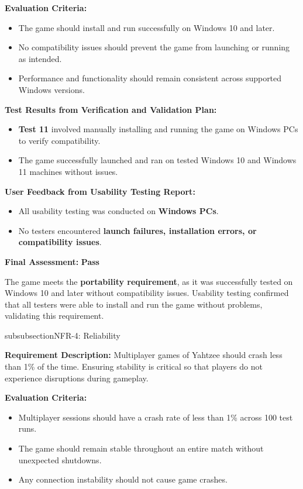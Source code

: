 \documentclass[12pt, titlepage]{article}
\begin{document}
\textbf{Evaluation Criteria:}  
\begin{itemize}
    \item The game should install and run successfully on Windows 10 and later.
    \item No compatibility issues should prevent the game from launching or running as intended.
    \item Performance and functionality should remain consistent across supported Windows versions.
\end{itemize}

\textbf{Test Results from Verification and Validation Plan:}  
\begin{itemize}
    \item \textbf{Test 11} involved manually installing and running the game on Windows PCs to verify compatibility.
    \item The game successfully launched and ran on tested Windows 10 and Windows 11 machines without issues.
\end{itemize}

\textbf{User Feedback from Usability Testing Report:}  
\begin{itemize}
    \item All usability testing was conducted on \textbf{Windows PCs}.
    \item No testers encountered \textbf{launch failures, installation errors, or compatibility issues}.
\end{itemize}

\textbf{Final Assessment:} \textbf{Pass}  

The game meets the \textbf{portability requirement}, as it was successfully tested on Windows 10 and later without compatibility issues. Usability testing confirmed that all testers were able to install and run the game without problems, validating this requirement.

\*subsubsection{NFR-4: Reliability}

\textbf{Requirement Description:}  
Multiplayer games of Yahtzee should crash less than 1\% of the time. Ensuring stability is critical so that players do not experience disruptions during gameplay.

\textbf{Evaluation Criteria:}  
\begin{itemize}
    \item Multiplayer sessions should have a crash rate of less than 1\% across 100 test runs.
    \item The game should remain stable throughout an entire match without unexpected shutdowns.
    \item Any connection instability should not cause game crashes.
\end{itemize}
\end{document}
